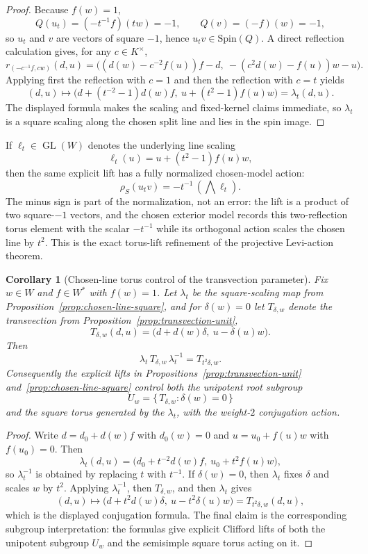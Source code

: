 \documentclass{birkjour}
\theoremstyle{plain}
\newtheorem{corollary}[theorem]{Corollary}
\theoremstyle{definition}
\theoremstyle{remark}
\numberwithin{equation}{section}
\newcommand{\Spin}{\mathrm{Spin}}
\begin{document}
\begin{proof}
Because $f(w)=1$,
\[
  Q(u_t)=(-t^{-1}f)(tw)=-1,
  \qquad
  Q(v)=(-f)(w)=-1,
\]
so $u_t$ and $v$ are vectors of square $-1$, hence $u_t v\in \Spin(Q)$. A
direct reflection calculation gives, for any $c\in K^\times$,
\[
  r_{(-c^{-1}f,cw)}(d,u)
  =\bigl((d(w)-c^{-2}f(u))f-d,\ -(c^2d(w)-f(u))w-u\bigr).
\]
Applying first the reflection with $c=1$ and then the reflection with $c=t$
yields
\[
  (d,u)\longmapsto
  \bigl(d+(t^{-2}-1)d(w)f,\ u+(t^2-1)f(u)w\bigr)=\lambda_t(d,u).
\]
The displayed formula makes the scaling and fixed-kernel claims immediate, so
$\lambda_t$ is a square scaling along the chosen split line and lies in the
spin image.
\end{proof}

If $\ell_t\in \operatorname{GL}(W)$ denotes the underlying line scaling
\[
  \ell_t(u)=u+(t^2-1)f(u)w,
\]
then the same explicit lift has a fully normalized chosen-model action:
\[
  \rho_S(u_t v)=-t^{-1}\,(\bigwedge \ell_t).
\]
The minus sign is part of the normalization, not an error: the lift is a product
of two square-$-1$ vectors, and the chosen exterior model records this
two-reflection torus element with the scalar $-t^{-1}$ while its orthogonal
action scales the chosen line by $t^2$.
This is the exact torus-lift refinement of the projective Levi-action theorem.

\begin{corollary}[Chosen-line torus control of the transvection parameter]
\label{cor:torus-transvection}
Fix $w\in W$ and $f\in W^*$ with $f(w)=1$. Let $\lambda_t$ be the square-scaling
map from Proposition~\ref{prop:chosen-line-square}, and for $\delta(w)=0$ let
$T_{\delta,w}$ denote the transvection from
Proposition~\ref{prop:transvection-unit},
\[
  T_{\delta,w}(d,u)=\bigl(d+d(w)\delta,\ u-\delta(u)w\bigr).
\]
Then
\[
  \lambda_t\,T_{\delta,w}\,\lambda_t^{-1}=T_{t^2\delta,w}.
\]
Consequently the explicit lifts in
Propositions~\ref{prop:transvection-unit} and~\ref{prop:chosen-line-square}
control both the unipotent root subgroup
\[
  U_w=\{\,T_{\delta,w} : \delta(w)=0\,\}
\]
and the square torus generated by the $\lambda_t$, with the weight-$2$
conjugation action.
\end{corollary}

\begin{proof}
Write $d=d_0+d(w)f$ with $d_0(w)=0$ and $u=u_0+f(u)w$ with $f(u_0)=0$. Then
\[
  \lambda_t(d,u)=\bigl(d_0+t^{-2}d(w)f,\ u_0+t^2f(u)w\bigr),
\]
so $\lambda_t^{-1}$ is obtained by replacing $t$ with $t^{-1}$. If
$\delta(w)=0$, then $\lambda_t$ fixes $\delta$ and scales $w$ by $t^2$. Applying
$\lambda_t^{-1}$, then $T_{\delta,w}$, and then $\lambda_t$ gives
\[
  (d,u)\longmapsto \bigl(d+t^2d(w)\delta,\ u-t^2\delta(u)w\bigr)
  = T_{t^2\delta,w}(d,u),
\]
which is the displayed conjugation formula. The final claim is the corresponding
subgroup interpretation: the formulas give explicit Clifford lifts of both the
unipotent subgroup $U_w$ and the semisimple square torus acting on it.
\end{proof}
\end{document}

